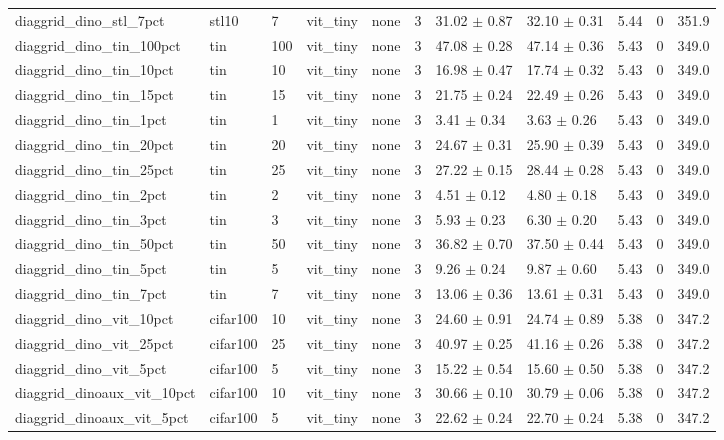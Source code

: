 \begin{tabular}{lllllllllll}
diaggrid_dino_stl_7pct & stl10 & 7 & vit_tiny & none & 3 & 31.02 $\pm$ 0.87 & 32.10 $\pm$ 0.31 & 5.44 & 0 & 351.9 \\
diaggrid_dino_tin_100pct & tin & 100 & vit_tiny & none & 3 & 47.08 $\pm$ 0.28 & 47.14 $\pm$ 0.36 & 5.43 & 0 & 349.0 \\
diaggrid_dino_tin_10pct & tin & 10 & vit_tiny & none & 3 & 16.98 $\pm$ 0.47 & 17.74 $\pm$ 0.32 & 5.43 & 0 & 349.0 \\
diaggrid_dino_tin_15pct & tin & 15 & vit_tiny & none & 3 & 21.75 $\pm$ 0.24 & 22.49 $\pm$ 0.26 & 5.43 & 0 & 349.0 \\
diaggrid_dino_tin_1pct & tin & 1 & vit_tiny & none & 3 & 3.41 $\pm$ 0.34 & 3.63 $\pm$ 0.26 & 5.43 & 0 & 349.0 \\
diaggrid_dino_tin_20pct & tin & 20 & vit_tiny & none & 3 & 24.67 $\pm$ 0.31 & 25.90 $\pm$ 0.39 & 5.43 & 0 & 349.0 \\
diaggrid_dino_tin_25pct & tin & 25 & vit_tiny & none & 3 & 27.22 $\pm$ 0.15 & 28.44 $\pm$ 0.28 & 5.43 & 0 & 349.0 \\
diaggrid_dino_tin_2pct & tin & 2 & vit_tiny & none & 3 & 4.51 $\pm$ 0.12 & 4.80 $\pm$ 0.18 & 5.43 & 0 & 349.0 \\
diaggrid_dino_tin_3pct & tin & 3 & vit_tiny & none & 3 & 5.93 $\pm$ 0.23 & 6.30 $\pm$ 0.20 & 5.43 & 0 & 349.0 \\
diaggrid_dino_tin_50pct & tin & 50 & vit_tiny & none & 3 & 36.82 $\pm$ 0.70 & 37.50 $\pm$ 0.44 & 5.43 & 0 & 349.0 \\
diaggrid_dino_tin_5pct & tin & 5 & vit_tiny & none & 3 & 9.26 $\pm$ 0.24 & 9.87 $\pm$ 0.60 & 5.43 & 0 & 349.0 \\
diaggrid_dino_tin_7pct & tin & 7 & vit_tiny & none & 3 & 13.06 $\pm$ 0.36 & 13.61 $\pm$ 0.31 & 5.43 & 0 & 349.0 \\
diaggrid_dino_vit_10pct & cifar100 & 10 & vit_tiny & none & 3 & 24.60 $\pm$ 0.91 & 24.74 $\pm$ 0.89 & 5.38 & 0 & 347.2 \\
diaggrid_dino_vit_25pct & cifar100 & 25 & vit_tiny & none & 3 & 40.97 $\pm$ 0.25 & 41.16 $\pm$ 0.26 & 5.38 & 0 & 347.2 \\
diaggrid_dino_vit_5pct & cifar100 & 5 & vit_tiny & none & 3 & 15.22 $\pm$ 0.54 & 15.60 $\pm$ 0.50 & 5.38 & 0 & 347.2 \\
diaggrid_dinoaux_vit_10pct & cifar100 & 10 & vit_tiny & none & 3 & 30.66 $\pm$ 0.10 & 30.79 $\pm$ 0.06 & 5.38 & 0 & 347.2 \\
diaggrid_dinoaux_vit_5pct & cifar100 & 5 & vit_tiny & none & 3 & 22.62 $\pm$ 0.24 & 22.70 $\pm$ 0.24 & 5.38 & 0 & 347.2 \\

\end{tabular}
